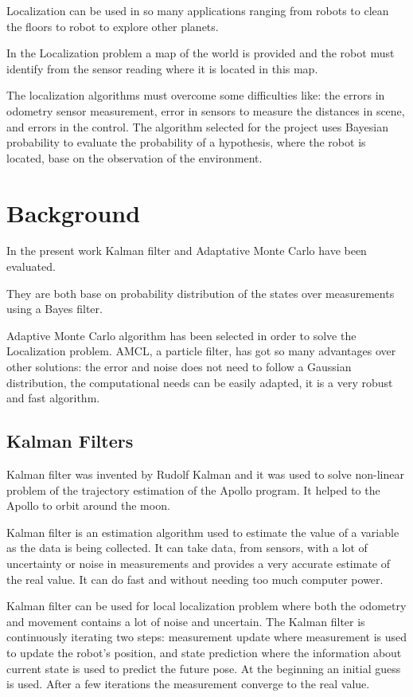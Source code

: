 \documentclass[10pt,journal,compsoc]{IEEEtran}
\begin{document}
Localization can be used in so many applications ranging from robots to clean the floors to robot to explore other planets.

In the Localization problem a map of the world is provided and the robot must identify from the sensor reading where it is located in this map.

The localization algorithms must overcome some difficulties like: the errors in odometry sensor measurement, error in sensors to measure the distances in scene, and errors in the control. The algorithm selected for the project uses Bayesian probability to evaluate the probability of a hypothesis, where the robot is located, base on the observation of the environment.

\section{Background}
In the present work Kalman filter and Adaptative Monte Carlo have been evaluated. 

They are both base on probability distribution of the states over measurements using a Bayes filter. 

Adaptive Monte Carlo algorithm has been selected in order to solve the Localization problem. AMCL, a particle filter, has got so many advantages over other solutions: the error and noise does not need to follow a Gaussian distribution, the computational needs can be easily adapted, it is a very robust and fast algorithm.\cite{probabilisticrobotics}\cite{robustmontecarlo}\cite{udacity}

\subsection{Kalman Filters}

Kalman filter was invented by Rudolf Kalman and it was used to solve non-linear problem of the trajectory estimation of the Apollo program. It helped to the Apollo to orbit around the moon. 

Kalman filter is an estimation algorithm used to estimate the value of a variable as the data is being collected. It can take data, from sensors, with a lot of uncertainty or noise in measurements and provides a very accurate estimate of the real value. It can do fast and without needing too much computer power. 

Kalman filter can be used for local localization problem where both the odometry and movement contains a lot of noise and uncertain. The Kalman filter is continuously iterating two steps: measurement update where measurement is used to update the robot's position, and state prediction where the information about current state is used to predict the future pose. At the beginning an initial guess is used. After a few iterations the measurement converge to the real value.
\end{document}
